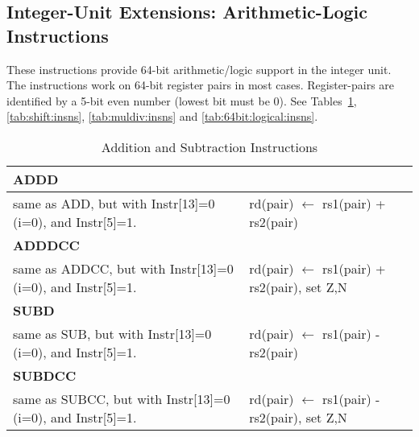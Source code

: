 \subsection{Integer-Unit Extensions: Arithmetic-Logic Instructions}
\label{sec:integer-unit-extns:arith-logic-insns}



These  instructions provide  64-bit  arithmetic/logic  support in  the
integer unit.  The instructions work  on 64-bit register pairs in most
cases.  Register-pairs are  identified by a 5-bit  even number (lowest
bit     must     be     0).      See     Tables~\ref{tab:arith:insns},
\ref{tab:shift:insns},            \ref{tab:muldiv:insns}           and
\ref{tab:64bit:logical:insns}.

\begin{table}[p]
  \centering
  \begin{tabular}[p]{|l|l|}
    \hline
\multicolumn{2}{|l|}{	\textbf{ADDD}			} \\ 
\hline
 		  same as ADD, but with Instr[13]=0 (i=0), and Instr[5]=1. & 
 		rd(pair) $\leftarrow$ rs1(pair) + rs2(pair)\\
\hline
\hline
\multicolumn{2}{|l|}{	\textbf{ADDDCC}} \\ 
\hline
 		  same as ADDCC, but with Instr[13]=0 (i=0), and Instr[5]=1. & 
 		rd(pair) $\leftarrow$ rs1(pair) + rs2(pair), set Z,N\\
\hline
\hline
\multicolumn{2}{|l|}{	\textbf{SUBD}} \\ 
\hline
 		  same as SUB, but with Instr[13]=0 (i=0), and Instr[5]=1. & 
 		rd(pair) $\leftarrow$ rs1(pair) - rs2(pair)\\
\hline
\hline
\multicolumn{2}{|l|}{	\textbf{SUBDCC}} \\ 
\hline
 		  same as SUBCC, but with Instr[13]=0 (i=0), and Instr[5]=1. & 
 		rd(pair) $\leftarrow$ rs1(pair) - rs2(pair), set Z,N\\
\hline
  \end{tabular}
  \caption{Addition and Subtraction Instructions}
  \label{tab:arith:insns}
\end{table}

